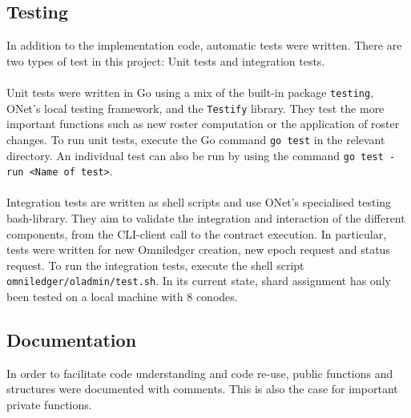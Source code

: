 \subsection{Testing}
In addition to the implementation code, automatic tests were written. There are two types of test in this project: Unit tests and integration tests. \\\\
Unit tests were written in Go using a mix of the built-in package \texttt{testing}\cite{testing}, ONet's local testing framework\cite{onet}, and the \texttt{Testify}\cite{testify} library. They test the more important functions such as new roster computation or the application of roster changes. To run unit tests, execute the Go command \texttt{go test} in the relevant directory. An individual test can also be run by using the command \texttt{go test -run <Name of test>}. \\\\
Integration tests are written as shell scripts and use ONet's specialised testing bash-library\cite{libtest}. They aim to validate the integration and interaction of the different components, from the CLI-client call to the contract execution. In particular, tests were written for new Omniledger creation, new epoch request and status request. To run the integration tests, execute the shell script \texttt{omniledger/oladmin/test.sh}. In its current state, shard assignment has only been tested on a local machine with 8 conodes.

\subsection{Documentation}
In order to facilitate code understanding and code re-use, public functions and structures were documented with comments. This is also the case for important private functions.
